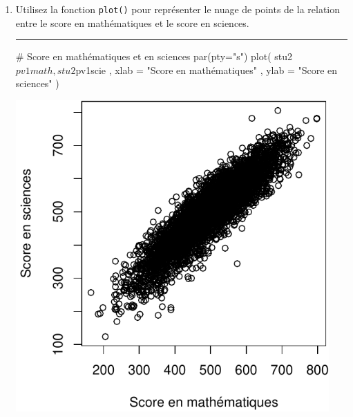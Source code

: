 \documentclass[12pt,twosided, notitlepage]{book}
\newenvironment{Shaded}{}{}
\newcommand{\KeywordTok}[1]{\textcolor[rgb]{0.00,0.00,1.00}{#1}}
\newcommand{\DataTypeTok}[1]{#1}
\newcommand{\StringTok}[1]{\textcolor[rgb]{0.00,0.50,0.50}{#1}}
\newcommand{\CommentTok}[1]{\textcolor[rgb]{0.00,0.50,0.00}{#1}}
\newcommand{\OperatorTok}[1]{#1}
\newcommand{\NormalTok}[1]{#1}
\newif \ifsol
\renewenvironment{Shaded}{\begin{snugshade}}{\end{snugshade}}
\begin{document}
\begin{enumerate}
  \begin{center} \rule{0.5\linewidth}{\linethickness}\end{center}

  \bigskip  \fi 
\item
  Utilisez la fonction \texttt{plot()} pour représenter le nuage de
  points de la relation entre le score en mathématiques et le score en
  sciences.

  \ifsol 

  \begin{center} \rule{0.5\linewidth}{\linethickness}\end{center}

\begin{Shaded}
\begin{Highlighting}[]
\CommentTok{# Score en mathématiques et en sciences}
\KeywordTok{par}\NormalTok{(}\DataTypeTok{pty=}\StringTok{"s"}\NormalTok{)}
\KeywordTok{plot}\NormalTok{(}
\NormalTok{  stu2}\OperatorTok{$}\NormalTok{pv1math, stu2}\OperatorTok{$}\NormalTok{pv1scie}
\NormalTok{  , }\DataTypeTok{xlab =} \StringTok{"Score en mathématiques"}
\NormalTok{  , }\DataTypeTok{ylab =} \StringTok{"Score en sciences"}
\NormalTok{)}
\end{Highlighting}
\end{Shaded}

  \begin{center}\includegraphics[width=12cm]{livret_files/figure-latex/unnamed-chunk-482-1} \end{center}


\end{enumerate}
\end{document}
